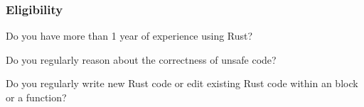 \subsubsection{Eligibility}
\label{survey:eligibility}
\begin{protocol}
\item \label{sc:req-exp}  Do you have more than 1 year of experience using Rust?

\item \label{sc:unsafe}  Do you regularly reason about the correctness of unsafe code?
\item {} Do you regularly write new Rust code or edit existing Rust code within an \unsafe block or a function?
\end{protocol}


